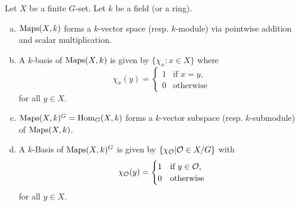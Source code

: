 \begin{lem}\label{lem: basis of Maps and Hom}
 Let $X$ be a finite $G$-set. Let $k$ be a field (or a ring).
 \begin{enumerate}[a)]
  \item
   $\operatorname{Maps}(X,k)$ forms a $k$-vector space (resp. $k$-module) via pointwise addition and scalar multiplication.
  \item
   A $k$-basis of $\operatorname{Maps}(X,k)$ is given by $\{\chi_x : x \in X\}$ where
   \[
    \chi_x(y) =
    \begin{cases}
     1 & \text{if } x=y, \\
     0 & \text{otherwise}
    \end{cases}
   \]
   for all $y \in X$.
  \item
   $\operatorname{Maps}(X,k)^G = \operatorname{Hom}_G(X,k)$ forms a $k$-vector subspace (resp. $k$-submodule) of $\operatorname{Maps}(X,k)$.
  \item
   A $k$-Basis of $\operatorname{Maps}(X,k)^G$ is given by $\{\chi_\mathcal{O} | \mathcal{O} \in X/G\}$ with
   \[
    \chi_\mathcal{O}(y) =
    \begin{cases}
     1 & \text{if } y \in \mathcal{O}, \\
     0 & \text{otherwise}
    \end{cases}
   \]
   for all $y \in X$.
 \end{enumerate}
\end{lem}
